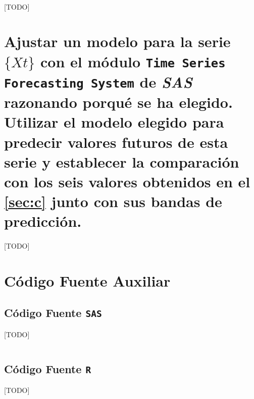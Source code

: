 \documentclass[a4paper, spanish]{article}
\begin{document}
    \paragraph{}
    [TODO]

  \section{Ajustar un modelo para la serie $\{ Xt \}$ con el módulo \texttt{Time Series Forecasting System} de \emph{SAS} razonando porqué se ha elegido. Utilizar el modelo elegido para predecir valores futuros de esta serie y establecer la comparación con los seis valores obtenidos en el \autoref{sec:c} junto con sus bandas de predicción.}
  \label{sec:f}

    \paragraph{}
    [TODO]

  \appendix
  \section{Código Fuente Auxiliar}
  \label{appendix:source_code}

    \subsection{Código Fuente \texttt{SAS}}
    \label{appendix:source_code_sas}
      [TODO]

      \begin{listing}[htb!]
        \centering
        \inputminted{SAS}{./res/code/a-01-data.sas}
        \caption{Generación del conjunto de datos \texttt{EJ2.SEMANAL}}
        \label{code:data_import}
      \end{listing}


    \subsection{Código Fuente \texttt{R}}
    \label{appendix:source_code_r}
      [TODO]

      \begin{listing}[htb!]
        \centering
        \inputminted{SAS}{./res/code/r/semanal.r}
        \caption{[TODO]}
        \label{code:semanal_analysis}
      \end{listing}
\end{document}

